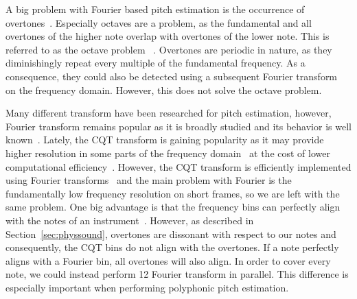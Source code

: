 \documentclass[a4paper,10pt,twocolumn]{article}
\begin{document}
A big problem with Fourier based pitch estimation is the occurrence of overtones~\cite{oud}. Especially octaves are a problem, as the fundamental and all overtones of the higher note overlap with overtones of the lower note. This is referred to as the octave problem~
\cite{octave}. Overtones are periodic in nature, as they diminishingly repeat every multiple of the fundamental frequency. As a consequence, they could also be detected using a subsequent Fourier transform~\cite{doublefourier} on the frequency domain. However, this does not solve the octave problem.

Many different transform have been researched for pitch estimation, however, Fourier transform remains popular as it is broadly studied and its behavior is well known~\cite{survey}. Lately, the CQT transform is gaining popularity as it may provide higher resolution in some parts of the frequency domain~\cite{cqtres} at the cost of lower computational efficiency~\cite{cqtslow}. However, the CQT transform is efficiently implemented using Fourier transforms~\cite{cqtfft} and the main problem with Fourier is the fundamentally low frequency resolution on short frames, so we are left with the same problem. One big advantage is that the frequency bins can perfectly align with the notes of an instrument~\cite{cqtalign}. However, as described in Section~\ref{sec:physsound}, overtones are dissonant with respect to our notes and consequently, the CQT bins do not align with the overtones. If a note perfectly aligns with a Fourier bin, all overtones will also align. In order to cover every note, we could instead perform 12 Fourier transform in parallel. This difference is especially important when performing polyphonic pitch estimation.


\end{document}
